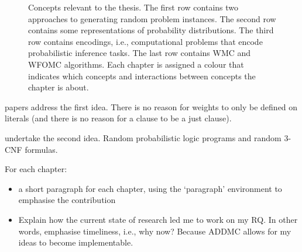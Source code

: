 \begin{figure}[t]
  \caption{Concepts relevant to the thesis. The first row contains two approaches to generating random problem instances. The second row contains some representations of probability distributions. The third row contains encodings, i.e., computational problems that encode probabilistic inference tasks. The last row contains WMC and WFOMC algorithms. Each chapter is assigned a colour that indicates which concepts and interactions between concepts the chapter is about.}
  \label{fig:overview}
\end{figure}


 papers address the first idea. There is no reason for weights to only be defined on literals (and there is no reason for a clause to be a just clause).

 undertake the second idea. Random probabilistic logic programs and random 3-CNF formulas.


For each chapter:
\begin{itemize}
\item a short paragraph for each chapter, using the `paragraph' environment to emphasise the contribution
\item Explain how the current state of research led me to work on my RQ. In other words, emphasise timeliness, i.e., why now? Because ADDMC allows for my ideas to become implementable.
\end{itemize}

